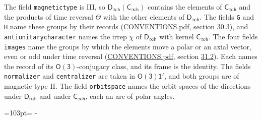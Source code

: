 \documentclass[10pt,a4paper]{article}
\newcommand{\needspace}[1]{\par\penalty-100\begingroup\dimen0=#1\relax\dimen2=\pagegoal
  \advance\dimen2-\pagetotal\ifdim\dimen0>\dimen2\relax\ifdim\dimen2>0pt\vfil\break\fi\fi
  \endgroup}
\numberwithin{equation}{section}
\newcommand{\grp}[1]{\mathsf{#1}}
\begin{document}
The field \texttt{magnetictype} is III, so $\grp{D_{\infty h}}(\grp{C_{\infty h}})$ contains the elements of $\grp{C_{\infty h}}$ and the products of time reversal $\varTheta$ with the other elements of $\grp{D_{\infty h}}$. The fields \texttt{G} and \texttt{H} name these groups by their records (\href{../../CONVENTIONS.pdf}{CONVENTIONS.pdf}, section \href{../../CONVENTIONS.pdf\#conv.30.3}{30.3}), and \texttt{antiunitarycharacter} names the irrep $\chi$ of $\grp{D_{\infty h}}$ with kernel $\grp{C_{\infty h}}$. The four fields \texttt{images} name the groups by which the elements move a polar or an axial vector, even or odd under time reversal (\href{../../CONVENTIONS.pdf}{CONVENTIONS.pdf}, section \href{../../CONVENTIONS.pdf\#conv.31.2}{31.2}). Each names the record of its $\grp{O(3)}$-conjugacy class, and its frame is the identity. The fields \texttt{normalizer} and \texttt{centralizer} are taken in $\grp{O(3)1'}$, and both groups are of magnetic type II. The field \texttt{orbitspace} names the orbit spaces of the directions under $\grp{D_{\infty h}}$ and under $\grp{C_{\infty h}}$, each an arc of polar angles.
\needspace{103pt}
\end{document}
